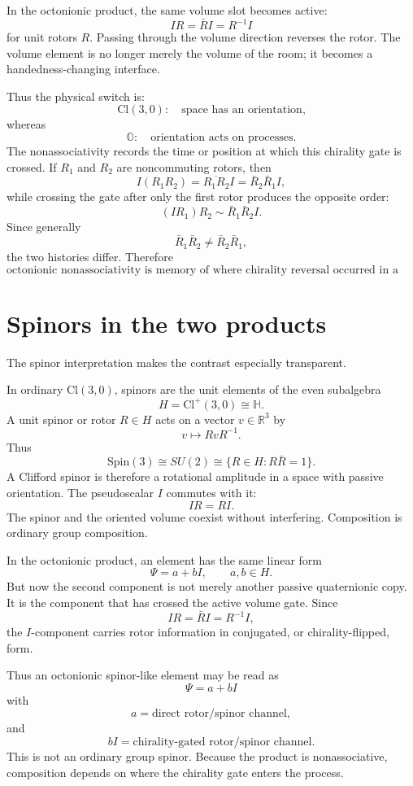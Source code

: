 \documentclass[11pt]{article}
\newcommand{\Cl}{\mathrm{Cl}}
\newcommand{\OO}{\mathbb O}
\begin{document}
In the octonionic product, the same volume slot becomes active:
\[
IR=\bar R I=R^{-1}I
\]
for unit rotors $R$. Passing through the volume direction reverses the rotor.
The volume element is no longer merely the volume of the room; it becomes a
handedness-changing interface.

Thus the physical switch is:
\[
\Cl(3,0):\quad \text{space has an orientation,}
\]
whereas
\[
\OO:\quad \text{orientation acts on processes.}
\]
The nonassociativity records the time or position at which this chirality gate
is crossed. If $R_1$ and $R_2$ are noncommuting rotors, then
\[
I(R_1R_2)=\overline{R_1R_2}I=\bar R_2\bar R_1 I,
\]
while crossing the gate after only the first rotor produces the opposite order:
\[
(IR_1)R_2\sim \bar R_1\bar R_2 I.
\]
Since generally
\[
\bar R_1\bar R_2\neq \bar R_2\bar R_1,
\]
the two histories differ. Therefore
\[
\boxed{
\text{octonionic nonassociativity is memory of where chirality reversal occurred in a rotational process.}
}
\]

\section{Spinors in the two products}

The spinor interpretation makes the contrast especially transparent.

In ordinary $\Cl(3,0)$, spinors are the unit elements of the even subalgebra
\[
H=\Cl^+(3,0)\cong\mathbb H.
\]
A unit spinor or rotor $R\in H$ acts on a vector $v\in\mathbb R^3$ by
\[
v\mapsto RvR^{-1}.
\]
Thus
\[
\mathrm{Spin}(3)\cong SU(2)\cong \{R\in H:R\bar R=1\}.
\]
A Clifford spinor is therefore a rotational amplitude in a space with passive
orientation. The pseudoscalar $I$ commutes with it:
\[
IR=RI.
\]
The spinor and the oriented volume coexist without interfering. Composition is
ordinary group composition.

In the octonionic product, an element has the same linear form
\[
\Psi=a+bI,
\qquad a,b\in H.
\]
But now the second component is not merely another passive quaternionic copy.
It is the component that has crossed the active volume gate. Since
\[
IR=\bar R I=R^{-1}I,
\]
the $I$-component carries rotor information in conjugated, or chirality-flipped,
form.

Thus an octonionic spinor-like element may be read as
\[
\Psi=a+bI
\]
with
\[
a=\text{direct rotor/spinor channel},
\]
and
\[
bI=\text{chirality-gated rotor/spinor channel}.
\]
This is not an ordinary group spinor. Because the product is nonassociative,
composition depends on where the chirality gate enters the process.
\end{document}
